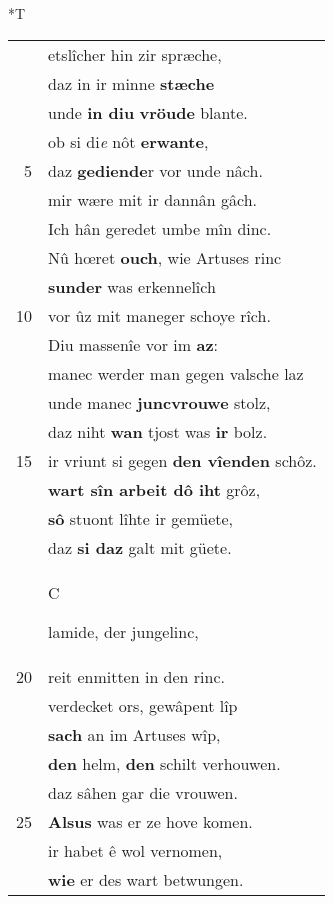 \documentclass[8pt,a4paper,notitlepage]{article}
\begin{document}
\begin{table}[ht]
\begin{minipage}[t]{0.5\linewidth}
\end{minipage}
\hspace{0.5cm}
\begin{minipage}[t]{0.5\linewidth}
\small
\begin{center}*T
\end{center}
\begin{tabular}{rl}
 & etslîcher hin zir spræche,\\ 
 & daz in ir minne \textbf{stæche}\\ 
 & unde \textbf{in diu} \textbf{vröude} blante.\\ 
 & ob si di\textit{e} nôt \textbf{erwante},\\ 
5 & daz \textbf{gediende}r vor unde nâch.\\ 
 & mir wære mit ir dannân gâch.\\ 
 & Ich hân geredet umbe mîn dinc.\\ 
 & Nû hœret \textbf{ouch}, wie Artuses rinc\\ 
 & \textbf{sunder} was erkennelîch\\ 
10 & vor ûz mit maneger schoye rîch.\\ 
 & Diu massenîe vor im \textbf{az}:\\ 
 & manec werder man gegen valsche laz\\ 
 & unde manec \textbf{juncvrouwe} stolz,\\ 
 & daz niht \textbf{wan} tjost was \textbf{ir} bolz.\\ 
15 & ir vriunt si gegen \textbf{den vîenden} schôz.\\ 
 & \textbf{wart sîn arbeit dô iht} grôz,\\ 
 & \textbf{sô} stuont lîhte ir gemüete,\\ 
 & daz \textbf{si daz} galt mit güete.\\ 
 & \begin{large}C\end{large}lamide, der jungelinc,\\ 
20 & reit enmitten in den rinc.\\ 
 & verdecket ors, gewâpent lîp\\ 
 & \textbf{sach} an im Artuses wîp,\\ 
 & \textbf{den} helm, \textbf{den} schilt verhouwen.\\ 
 & daz sâhen gar die vrouwen.\\ 
25 & \textbf{Alsus} was er ze hove komen.\\ 
 & ir habet ê wol vernomen,\\ 
 & \textbf{wie} er des wart betwungen.\\ 

\end{tabular}
\end{minipage}
\end{table}
\end{document}
